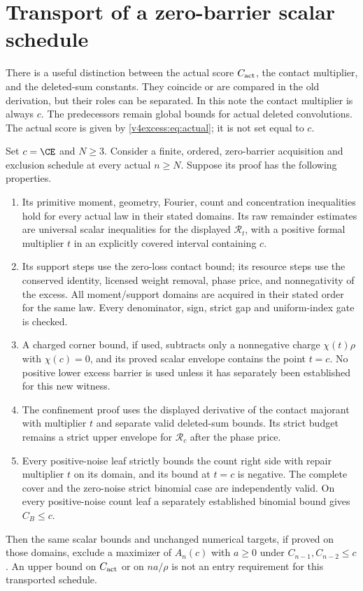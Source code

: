 \section{Transport of a zero-barrier scalar schedule}
There is a useful distinction between the actual score $C_{\rm act}$,
the contact multiplier, and the deleted-sum constants. They coincide or
are compared in the old derivation, but their roles can be separated.
In this note the contact multiplier is always $c$. The predecessors
remain global bounds for actual deleted convolutions. The actual score
is given by \eqref{v4excess:eq:actual}; it is not set equal to $c$.

\begin{theorem}\label{v4excess:thm:transport}
Set $c=\CE$ and $N\ge3$. Consider a finite, ordered, zero-barrier acquisition
and exclusion schedule at every actual $n\ge N$. Suppose its proof has the following
properties.
\begin{enumerate}
\item Its primitive moment, geometry, Fourier, count and concentration
inequalities hold for every actual law in their stated domains. Its raw
remainder estimates are universal scalar inequalities for the displayed
$\mathcal R_t$, with a positive formal multiplier $t$ in an explicitly
covered interval containing $c$.
\item Its support steps use the zero-loss contact bound; its resource
steps use the conserved identity, licensed weight removal, phase price,
and nonnegativity of the excess. All moment/support domains are acquired
in their stated order for the same law. Every denominator, sign, strict
gap and uniform-index gate is checked.
\item A charged corner bound, if used, subtracts only a nonnegative
charge $\chi(t)\rho$ with $\chi(c)=0$, and its proved scalar envelope
contains the point $t=c$. No positive lower excess barrier is used unless
it has separately been established for this new witness.
\item The confinement proof uses the displayed derivative of the contact
majorant with multiplier $t$ and separate valid deleted-sum bounds. Its
strict budget remains a strict upper envelope for $\mathcal R_c$ after
the phase price.
\item Every positive-noise leaf strictly bounds the count right side
with repair multiplier $t$ on its domain, and its bound at $t=c$ is
negative. The complete cover and the zero-noise strict binomial case
are independently valid. On every positive-noise count leaf a separately
established binomial bound gives $C_B\le c$.
\end{enumerate}
Then the same scalar bounds and unchanged numerical targets, if proved
on those domains, exclude a maximizer of $A_n(c)$ with $a\ge0$ under
$C_{n-1},C_{n-2}\le c$. An upper bound on $C_{\rm act}$ or on $na/\rho$
is not an entry requirement for this transported schedule.
\end{theorem}
